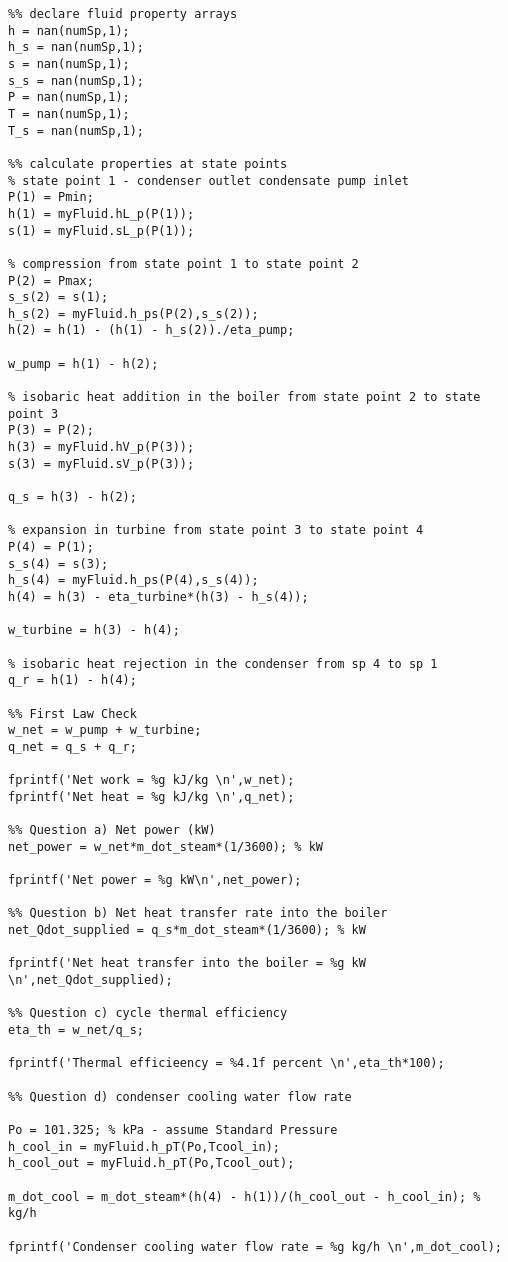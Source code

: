 \begin{fullwidth}
\begin{lstlisting}
%% declare fluid property arrays
h = nan(numSp,1);
h_s = nan(numSp,1);
s = nan(numSp,1);
s_s = nan(numSp,1);
P = nan(numSp,1);
T = nan(numSp,1);
T_s = nan(numSp,1);

%% calculate properties at state points 
% state point 1 - condenser outlet condensate pump inlet
P(1) = Pmin;
h(1) = myFluid.hL_p(P(1));
s(1) = myFluid.sL_p(P(1));

% compression from state point 1 to state point 2
P(2) = Pmax;
s_s(2) = s(1);
h_s(2) = myFluid.h_ps(P(2),s_s(2));
h(2) = h(1) - (h(1) - h_s(2))./eta_pump;

w_pump = h(1) - h(2);

% isobaric heat addition in the boiler from state point 2 to state point 3
P(3) = P(2);
h(3) = myFluid.hV_p(P(3));
s(3) = myFluid.sV_p(P(3));

q_s = h(3) - h(2);

% expansion in turbine from state point 3 to state point 4
P(4) = P(1);
s_s(4) = s(3);
h_s(4) = myFluid.h_ps(P(4),s_s(4));
h(4) = h(3) - eta_turbine*(h(3) - h_s(4));

w_turbine = h(3) - h(4);

% isobaric heat rejection in the condenser from sp 4 to sp 1
q_r = h(1) - h(4);

%% First Law Check
w_net = w_pump + w_turbine;
q_net = q_s + q_r;

fprintf('Net work = %g kJ/kg \n',w_net);
fprintf('Net heat = %g kJ/kg \n',q_net);

%% Question a) Net power (kW)
net_power = w_net*m_dot_steam*(1/3600); % kW

fprintf('Net power = %g kW\n',net_power);

%% Question b) Net heat transfer rate into the boiler
net_Qdot_supplied = q_s*m_dot_steam*(1/3600); % kW

fprintf('Net heat transfer into the boiler = %g kW \n',net_Qdot_supplied);

%% Question c) cycle thermal efficiency
eta_th = w_net/q_s;

fprintf('Thermal efficieency = %4.1f percent \n',eta_th*100);

%% Question d) condenser cooling water flow rate

Po = 101.325; % kPa - assume Standard Pressure
h_cool_in = myFluid.h_pT(Po,Tcool_in);
h_cool_out = myFluid.h_pT(Po,Tcool_out);

m_dot_cool = m_dot_steam*(h(4) - h(1))/(h_cool_out - h_cool_in); % kg/h

fprintf('Condenser cooling water flow rate = %g kg/h \n',m_dot_cool);
\end{lstlisting}
\end{fullwidth}

